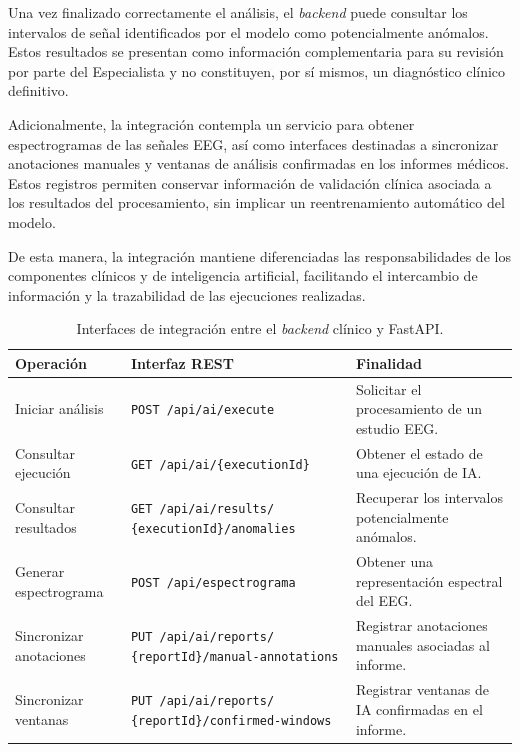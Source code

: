 Una vez finalizado correctamente el análisis,
el \textit{backend} puede consultar los intervalos de
señal identificados por el modelo como
potencialmente anómalos. Estos resultados se
presentan como información complementaria para
su revisión por parte del Especialista y no
constituyen, por sí mismos, un diagnóstico
clínico definitivo.

Adicionalmente, la integración contempla un
servicio para obtener espectrogramas de las
señales EEG, así como interfaces destinadas
a sincronizar anotaciones manuales y ventanas
de análisis confirmadas en los informes médicos.
Estos registros permiten conservar información
de validación clínica asociada a los resultados
del procesamiento, sin implicar un reentrenamiento
automático del modelo.

De esta manera, la integración mantiene
diferenciadas las responsabilidades de los
componentes clínicos y de inteligencia artificial,
facilitando el intercambio de información y
la trazabilidad de las ejecuciones realizadas.


\begin{table}[H]
\centering
\caption{Interfaces de integración entre el \textit{backend} clínico y FastAPI.}
\label{tab:interfaces-integracion-ia}

\small
\setlength{\tabcolsep}{4pt}
\renewcommand{\arraystretch}{1.3}

\begin{tabular}{|p{2.8cm}|p{6.0cm}|p{4.2cm}|}
\hline
\textbf{Operación} &
\textbf{Interfaz REST} &
\textbf{Finalidad} \\ \hline

Iniciar análisis &
\texttt{POST /api/ai/execute} &
Solicitar el procesamiento de un estudio EEG. \\ \hline

Consultar ejecución &
\texttt{GET /api/ai/\{executionId\}} &
Obtener el estado de una ejecución de IA. \\ \hline

Consultar resultados &
\texttt{GET /api/ai/results/}
\newline
\texttt{\{executionId\}/anomalies} &
Recuperar los intervalos potencialmente anómalos. \\ \hline

Generar espectrograma &
\texttt{POST /api/espectrograma} &
Obtener una representación espectral del EEG. \\ \hline

Sincronizar anotaciones &
\texttt{PUT /api/ai/reports/}
\newline
\texttt{\{reportId\}/manual-annotations} &
Registrar anotaciones manuales asociadas al informe. \\ \hline

Sincronizar ventanas &
\texttt{PUT /api/ai/reports/}
\newline
\texttt{\{reportId\}/confirmed-windows} &
Registrar ventanas de IA confirmadas en el informe. \\ \hline

\end{tabular}
\end{table}


